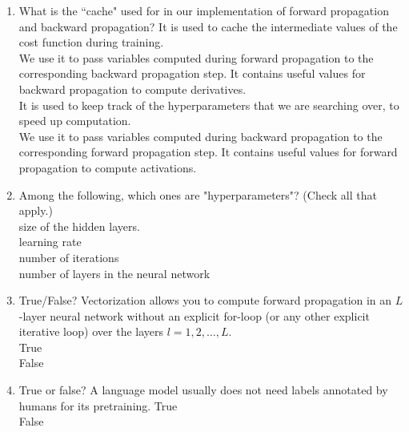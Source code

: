 \begin{enumerate}
    \item What is the ``cache" used for in our implementation of forward propagation and backward propagation? 
        \hspace{1cm}\choice{}  It is used to cache the intermediate values of the cost function during training. \\
        \hspace{1cm}\checkmark  We use it to pass variables computed during forward propagation to the corresponding backward propagation step. It contains useful values for backward propagation to compute derivatives. \\ 
        \hspace{1cm}\choice{} It is used to keep track of the hyperparameters that we are searching over, to speed up computation. \\ 
        \hspace{1cm}\choice{}  We use it to pass variables computed during backward propagation to the corresponding forward propagation step. It contains useful values for forward propagation to compute activations. \\ 
    \solution{}

    \item Among the following, which ones are "hyperparameters"? (Check all that apply.) \\
    \hspace{1cm}\checkmark size of the hidden layers. \\ 
    \hspace{1cm}\checkmark learning rate\\ 
    \hspace{1cm}\checkmark number of iterations \\ 
    \hspace{1cm}\checkmark number of layers  in the neural network \\ 
    \solution{}


    \item True/False? Vectorization allows you to compute forward propagation in an $L$-layer neural network without an explicit for-loop (or any other explicit iterative loop) over the layers $l=1, 2,  \hdots, L$. \\
    \hspace{1cm}\choice{} True \\
        \hspace{1cm}\checkmark False \\ 
        \solution{}
    

    \item True or false? A language model usually does not need labels annotated by humans for its pretraining.
        \hspace{1cm}\checkmark True \\
        \hspace{1cm}\choice{} False \\ 
        \solution{}


\end{enumerate}
